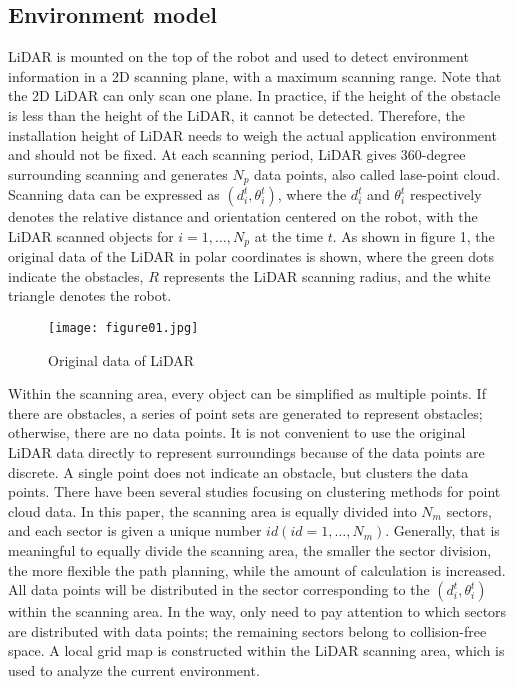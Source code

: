 \documentclass{iosart2c}
\begin{document}
\subsection{Environment model}\label{s3.1}
LiDAR is mounted on the top of the robot and used to detect environment information in a 2D scanning plane, with a maximum scanning range. Note that the 2D LiDAR can only scan one plane. In practice, if the height of the obstacle is less than the height of the LiDAR, it cannot be detected. Therefore, the installation height of LiDAR needs to weigh the actual application environment and should not be fixed. At each scanning period, LiDAR gives 360-degree surrounding scanning and generates $N_{p}$ data points, also called lase-point cloud. Scanning data can be expressed as $\left(d_{i}^{t}, \theta_{i}^{t}\right)$, where the $d_{i}^{t}$ and $\theta_{i}^{t}$ respectively denotes the relative distance and orientation centered on the robot, with the LiDAR scanned objects for $i=1, \ldots, N_{p}$ at the time $t$. As shown in figure 1, the original data of the LiDAR in polar coordinates is shown, where the green dots indicate the obstacles, $R$ represents the LiDAR scanning radius, and the  white triangle denotes the robot.

\begin{figure}[htbp]
\vspace{-0.2cm} 
\setlength{\abovecaptionskip}{0.1cm}  %
\texttt{[image: figure01.jpg]}
\caption{Original data of LiDAR}\label{f1}
\end{figure}

Within the scanning area, every object can be simplified as multiple points. If there are obstacles, a series of point sets are generated to represent obstacles; otherwise, there are no data points. It is not convenient to use the original LiDAR data directly to represent surroundings because of the data points are discrete. A single point does not indicate an obstacle, but clusters the data points. There have been several studies focusing on clustering methods for point cloud data. In this paper, the scanning area is equally divided into $N_{m}$ sectors, and each sector is given a unique number $i d\left(i d=1, \ldots, N_{m}\right)$. Generally, that is meaningful to equally divide the scanning area, the smaller the sector division, the more flexible the path planning, while the amount of calculation is increased. All data points will be distributed in the sector corresponding to the $\left(d_{i}^{t}, \theta_{i}^{t}\right)$ within the scanning area. In the way, only need to pay attention to which sectors are distributed with data points; the remaining sectors belong to collision-free space. A local grid map is constructed within the LiDAR scanning area, which is used to analyze the current environment.
\end{document}
